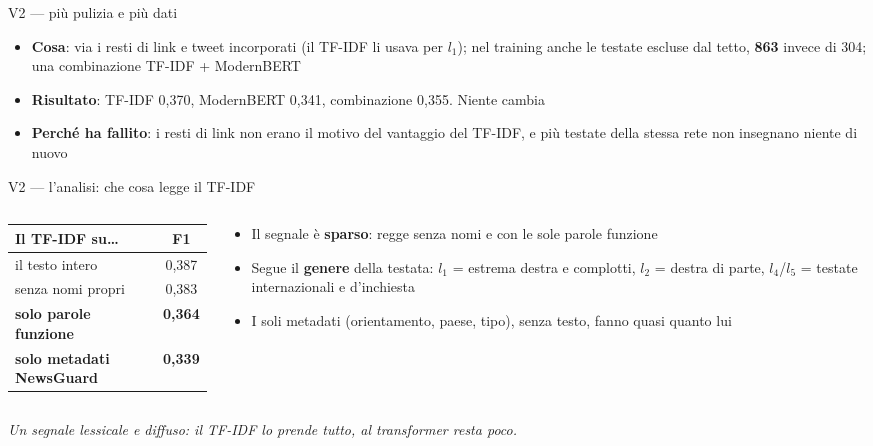 \documentclass[aspectratio=169]{beamer}
\newcommand{\hl}[1]{\textbf{#1}}
\begin{document}
\begin{frame}{V2 --- pi\`u pulizia e pi\`u dati}
  \begin{itemize}
    \setlength\itemsep{0.6em}
    \item \hl{Cosa}: via i resti di link e tweet incorporati (il TF-IDF li usava per $l_1$); nel training anche le testate escluse dal tetto, \hl{863} invece di 304; una combinazione TF-IDF + ModernBERT
    \item \hl{Risultato}: TF-IDF 0,370, ModernBERT 0,341, combinazione 0,355. Niente cambia
    \item \hl{Perch\'e ha fallito}: i resti di link non erano il motivo del vantaggio del TF-IDF, e pi\`u testate della stessa rete non insegnano niente di nuovo
  \end{itemize}
\end{frame}

\begin{frame}{V2 --- l'analisi: che cosa legge il TF-IDF}
  \begin{columns}[c]
    \begin{column}{0.46\textwidth}
      \centering\footnotesize
      \begin{tabular}{lc}
        \toprule
        \textbf{Il TF-IDF su\dots} & \textbf{F1} \\
        \midrule
        il testo intero & 0,387 \\
        senza nomi propri & 0,383 \\
        \textbf{solo parole funzione} & \textbf{0,364} \\
        \midrule
        \textbf{solo metadati NewsGuard} & \textbf{0,339} \\
        \bottomrule
      \end{tabular}
    \end{column}
    \begin{column}{0.54\textwidth}
      \begin{itemize}
        \setlength\itemsep{0.5em}
        \footnotesize
        \item Il segnale \`e \hl{sparso}: regge senza nomi e con le sole parole funzione
        \item Segue il \hl{genere} della testata: $l_1$ = estrema destra e complotti, $l_2$ = destra di parte, $l_4$/$l_5$ = testate internazionali e d'inchiesta
        \item I soli metadati (orientamento, paese, tipo), senza testo, fanno quasi quanto lui
      \end{itemize}
    \end{column}
  \end{columns}
  \vspace{0.6em}
  \centering\small\itshape Un segnale lessicale e diffuso: il TF-IDF lo prende tutto, al transformer resta poco.
\end{frame}
\end{document}
